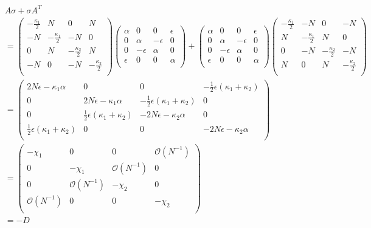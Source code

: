 \documentclass[11pt,a4paper]{article}
\numberwithin{equation}{section}
\begin{document}
	\begin{align*}
	&A\sigma +\sigma A^{T}&\\
	&= \begin{pmatrix}
	-\frac{\kappa_1}{2} & N & 0 & N\\
	-N & -\frac{\kappa_1}{2} & -N & 0 \\
	0 & N & -\frac{\kappa_2}{2} & N\\
	-N & 0 & -N & -\frac{\kappa_2}{2}\\
	\end{pmatrix}		\begin{pmatrix}
	\alpha & 0 & 0 & \epsilon\\
	0 & \alpha & -\epsilon & 0\\
	0 & -\epsilon & \alpha & 0 \\
	\epsilon & 0 & 0 & \alpha\\
	\end{pmatrix} + \begin{pmatrix}
	\alpha & 0 & 0 & \epsilon\\
	0 & \alpha & -\epsilon & 0\\
	0 & -\epsilon & \alpha & 0 \\
	\epsilon & 0 & 0 & \alpha\\
	\end{pmatrix}	\begin{pmatrix}
	-\frac{\kappa_1}{2} & -N & 0 & -N\\
	N & -\frac{\kappa_1}{2} & N & 0 \\
	0 & -N & -\frac{\kappa_2}{2} & -N\\
	N & 0 & N & -\frac{\kappa_2}{2}\\
	\end{pmatrix}&\\
	&= \begin{pmatrix}
	2N \epsilon - \kappa_1 \alpha & 0 & 0 & -\frac{1}{2} \epsilon (\kappa_1 + \kappa_2)\\
	0 & 2N \epsilon - \kappa_1 \alpha & -\frac{1}{2} \epsilon (\kappa_1 + \kappa_2) & 0 \\
	0 & \frac{1}{2} \epsilon (\kappa_1 + \kappa_2) & -2N \epsilon - \kappa_2 \alpha & 0\\
	\frac{1}{2} \epsilon (\kappa_1 + \kappa_2) & 0 & 0 & -2N \epsilon - \kappa_2 \alpha\\
	\end{pmatrix}&\\
	&= \begin{pmatrix}
	-\chi_1 & 0 & 0 & \mathcal{O}(N^{-1})\\
	0 & -\chi_1 & \mathcal{O}(N^{-1}) & 0 \\
	0 & \mathcal{O}(N^{-1}) & -\chi_2 & 0\\
	\mathcal{O}(N^{-1}) & 0 & 0 & -\chi_2\\
	\end{pmatrix}&\\
	&= -D& \tag*{so $\sigma$ is the steady state solution in the asymptotic limit.}
	\end{align*}
	
\end{document}
